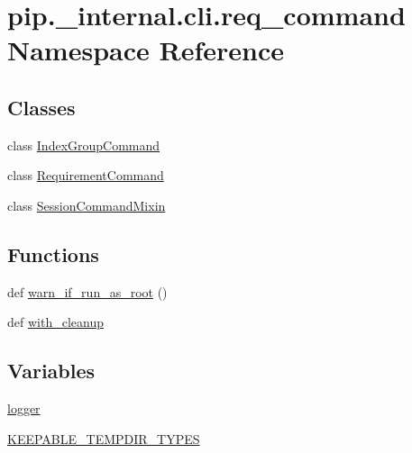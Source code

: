 \hypertarget{namespacepip_1_1__internal_1_1cli_1_1req__command}{}\section{pip.\+\_\+internal.\+cli.\+req\+\_\+command Namespace Reference}
\label{namespacepip_1_1__internal_1_1cli_1_1req__command}
\subsection*{Classes}
\begin{DoxyCompactItemize}
\item 
class \hyperlink{classpip_1_1__internal_1_1cli_1_1req__command_1_1IndexGroupCommand}{Index\+Group\+Command}
\item 
class \hyperlink{classpip_1_1__internal_1_1cli_1_1req__command_1_1RequirementCommand}{Requirement\+Command}
\item 
class \hyperlink{classpip_1_1__internal_1_1cli_1_1req__command_1_1SessionCommandMixin}{Session\+Command\+Mixin}
\end{DoxyCompactItemize}
\subsection*{Functions}
\begin{DoxyCompactItemize}
\item 
def \hyperlink{namespacepip_1_1__internal_1_1cli_1_1req__command_a49ed2c503c37454eb2cd554c9a903df3}{warn\+\_\+if\+\_\+run\+\_\+as\+\_\+root} ()
\item 
def \hyperlink{namespacepip_1_1__internal_1_1cli_1_1req__command_a01483dc3b1ec20f28893314cdbf697fb}{with\+\_\+cleanup}
\end{DoxyCompactItemize}
\subsection*{Variables}
\begin{DoxyCompactItemize}
\item 
\hyperlink{namespacepip_1_1__internal_1_1cli_1_1req__command_ab18cc0612f20d821fa933b64f3a1b605}{logger}
\item 
\hyperlink{namespacepip_1_1__internal_1_1cli_1_1req__command_af2721765d615a7e7386857707b788dde}{K\+E\+E\+P\+A\+B\+L\+E\+\_\+\+T\+E\+M\+P\+D\+I\+R\+\_\+\+T\+Y\+P\+ES}
\end{DoxyCompactItemize}


